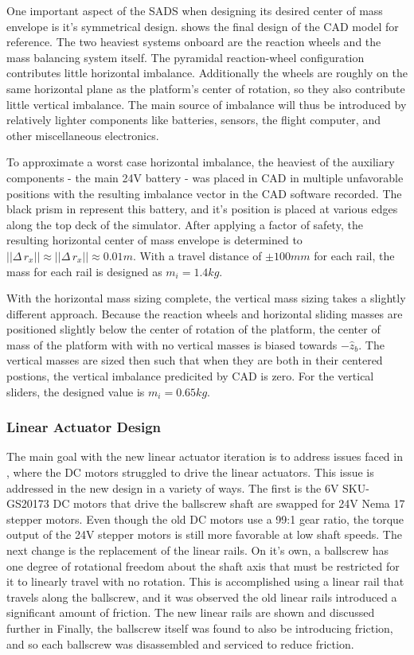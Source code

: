 One important aspect of the SADS when designing its desired center of mass envelope is it's symmetrical design.  shows the final design of the CAD model for reference. The two heaviest systems onboard are the reaction wheels and the mass balancing system itself. The pyramidal reaction-wheel configuration contributes little horizontal imbalance. Additionally the wheels are roughly on the same horizontal plane as the platform's center of rotation, so they also contribute little vertical imbalance. The main source of imbalance will thus be introduced by relatively lighter components like batteries, sensors, the flight computer, and other miscellaneous electronics.

To approximate a worst case horizontal imbalance, the heaviest of the auxiliary components - the main 24V battery - was placed in CAD in multiple unfavorable positions with the resulting imbalance vector in the CAD software recorded. The black prism in  represent this battery, and it's position is placed at various edges along the top deck of the simulator. After applying a factor of safety, the resulting horizontal center of mass envelope is determined to $||\Delta\,r_x|| \approx ||\Delta\,r_x|| \approx 0.01m$. With a travel distance of $\pm100mm$ for each rail, the mass for each rail is designed as $m_i = 1.4kg$.

With the horizontal mass sizing complete, the vertical mass sizing takes a slightly different approach. Because the reaction wheels and horizontal sliding masses are positioned slightly below the center of rotation of the platform, the center of mass of the platform with with no vertical masses is biased towards $-\hat{z}_b$. The vertical masses are sized then such that when they are both in their centered postions, the vertical imbalance predicited by CAD is zero. For the vertical sliders, the designed value is $m_i = 0.65kg$. 

\subsubsection{Linear Actuator Design}

The main goal with the new linear actuator iteration is to address issues faced in \cite{gilman_automatic_2024}, where the DC motors struggled to drive the linear actuators. This issue is addressed in the new design in a variety of ways. The first is the 6V SKU-GS20173 DC motors that drive the ballscrew shaft are swapped for 24V Nema 17 stepper motors. Even though the old DC motors use a 99:1 gear ratio, the torque output of the 24V stepper motors is still more favorable at low shaft speeds. The next change is the replacement of the linear rails. On it's own, a ballscrew has one degree of rotational freedom about the shaft axis that must be restricted for it to linearly travel with no rotation. This is accomplished using a linear rail that travels along the ballscrew, and it was observed the old linear rails introduced a significant amount of friction. The new linear rails are shown and discussed further in  Finally, the ballscrew itself was found to also be introducing friction, and so each ballscrew was disassembled and serviced to reduce friction.

